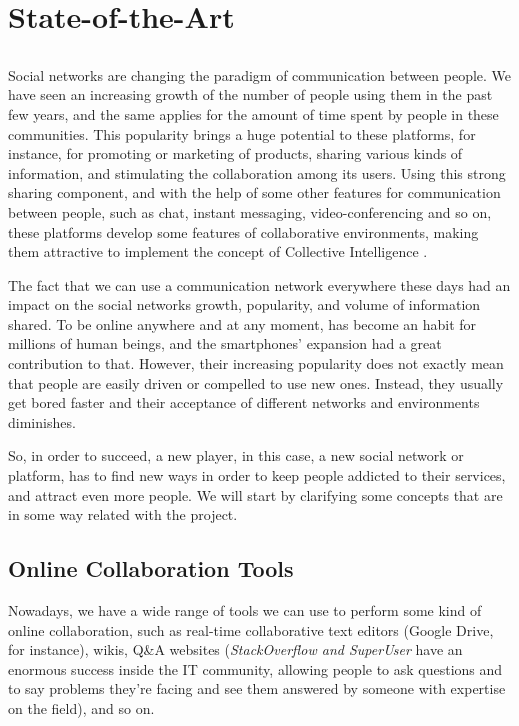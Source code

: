 \chapter{State-of-the-Art} \label{chap:chap2}

\section*{}

Social networks are changing the paradigm of communication between people. We have seen an increasing growth of the number of people using them in the past few years, and the same applies for the amount of time spent by people in these communities. This popularity brings a huge potential to these platforms, for instance, for promoting or marketing of products, sharing various kinds of information, and stimulating the collaboration among its users.
Using this strong sharing component, and with the help of some other features for communication between people, such as chat, instant messaging, video-conferencing and so on, these platforms develop some features of collaborative environments, making them attractive to implement the concept of Collective Intelligence \cite{kn:CSV11}. 

The fact that we can use a communication network everywhere these days had an impact on the social networks growth, popularity, and volume of information shared. To be online anywhere and at any moment, has become an habit for millions of human beings, and the smartphones' expansion had a great contribution to that. 
However, their increasing popularity does not exactly mean that people are easily driven or compelled to use new ones. Instead, they usually get bored faster and their acceptance of different networks and environments diminishes. 

So, in order to succeed, a new player, in this case, a new social network or platform, has to find new ways in order to keep people addicted to their services, and attract even more people.  We will start by clarifying some concepts that are in some way related with the project.

\section{Online Collaboration Tools}\label{sec:onlinecol}

Nowadays, we have a wide range of tools we can use to perform some kind of online collaboration, such as real-time collaborative text editors (Google Drive, for instance), wikis, Q\&A websites (\emph{StackOverflow and SuperUser} have an enormous success inside the IT community, allowing people to ask questions and to say problems they're facing and see them answered by someone with expertise on the field), and so on.

